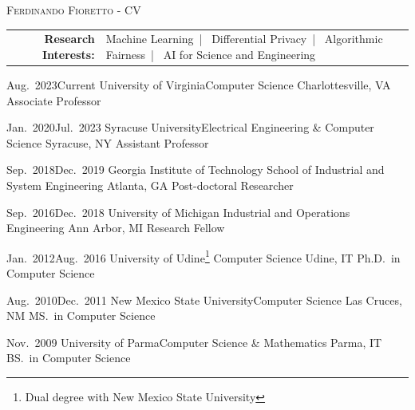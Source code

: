 \documentclass[localFont,alternative]{documentMETADATA}
\begin{document}
\makecvheader\sloppy\allowdisplaybreaks

	\makecvfooter
		{\textsc{}} %
		{\textsc{Ferdinando Fioretto - CV}}
		{\thepage}


\hspace{-12pt}	
	\begin{tabular}{r l} 
	{\bf Research Interests:} &
	{Machine Learning}~|~
	{Differential Privacy}~|~
	{Algorithmic Fairness}~|~
	{AI for Science and Engineering}
	\end{tabular}

\medskip

\begin{experiences}
  \job
    {Aug.~2023}{Current}
    {University of Virginia}{Computer Science}
    {Charlottesville, VA}
    {Associate Professor}
    \emptySeparator

  \job
    {Jan.~2020}{Jul.~2023}
    {Syracuse University}{Electrical Engineering \& Computer Science}
    {Syracuse, NY}
    {Assistant Professor}
\end{experiences}



\begin{experiences}
    \job
    {Sep.~2018}{Dec.~2019}
    {Georgia Institute of Technology}
    {School of Industrial and System Engineering}
    {Atlanta, GA}
    {Post-doctoral Researcher}
    \emptySeparator

   \job
    {Sep.~2016}{Dec.~2018}
    {University of Michigan}
    {Industrial and Operations Engineering}
    {Ann Arbor, MI}
    {Research Fellow}    
	\emptySeparator

  \job
    {Jan.~2012}{Aug.~2016}
    {University of Udine\footnote{Dual degree with New Mexico State University}}
    {Computer Science}
    {Udine, IT}
    {Ph.D.~in Computer Science}
    \emptySeparator

  \job
    {Aug.~2010}{Dec.~2011}
    {New Mexico State University}{Computer Science}
    {Las Cruces, NM}
    {MS.~in Computer Science}
	\emptySeparator

  \job
    {}{Nov.~2009}
    {University of Parma}{Computer Science \& Mathematics}
    {Parma, IT}
    {BS.~in Computer Science}
\end{experiences}
\end{document}
